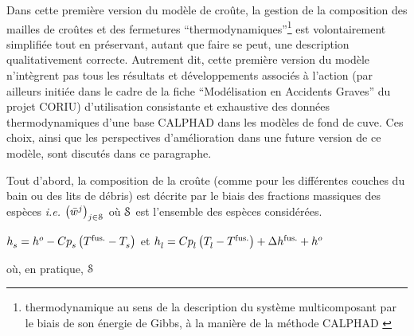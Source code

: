 
Dans cette première version du modèle de croûte, la gestion de la composition des mailles de croûtes et des fermetures ``thermodynamiques''\footnote{thermodynamique au sens de la description du système multicomposant par le biais de son énergie de Gibbs, à la manière de la méthode CALPHAD \cite{Lukas2007}} est volontairement simplifiée tout en préservant, autant que faire se peut, une description qualitativement correcte. Autrement dit, cette première version du modèle n'intègrent pas tous les résultats et développements associés à l'action (par ailleurs initiée dans le cadre de la fiche ``Modélisation en Accidents Graves'' du projet CORIU) d'utilisation consistante et exhaustive des données thermodynamiques d'une base CALPHAD dans les modèles de fond de cuve. Ces choix, ainsi que les perspectives d'amélioration dans une future version de ce modèle, sont discutés dans ce paragraphe.

Tout d'abord, la composition de la croûte (comme pour les différentes couches du bain ou des lits de débris) est décrite par le biais des fractions massiques des espèces \textit{i.e.} $\left(\avMassFraction[j]{}\right)_{j\in \speciesSet}$ où $\speciesSet$ est l'ensemble des espèces considérées.

$\massEnthalpy{s}=\massEnthalpy[o]{} - \heatCp{s} \left(\temperature[fus.]{} - \temperature{s}\right)$ et $\massEnthalpy{l} = \heatCp{l} \left(\temperature{l} - \temperature[fus.]{}\right) + \dEnthalpy[fus.]{} + \massEnthalpy[o]{}$



où, en pratique, $\speciesSet$


\cite{Tiwari2018}